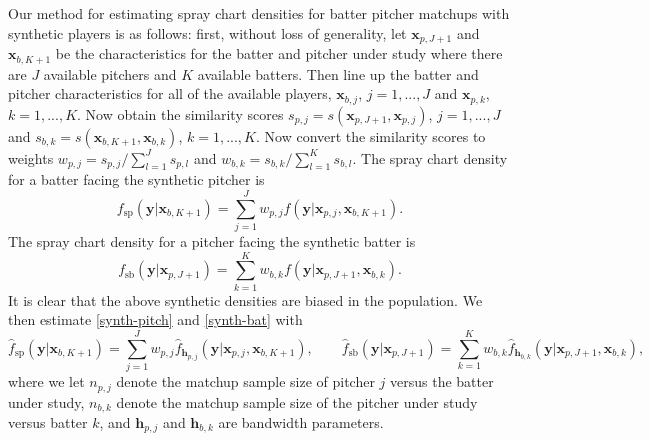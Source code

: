 \documentclass[11pt]{article}
\newcommand{\R}{\mathbb{R}}
\newcommand{\Xbf}{\textbf{X}}
\newcommand{\V}{\textbf{V}}
\newcommand{\W}{\textbf{W}}
\newcommand{\y}{\textbf{y}}
\newcommand{\x}{\textbf{x}}
\newcommand{\h}{\textbf{h}}
\newcommand{\Wstar}{\W^{\textstyle{*}}}
\begin{document}
Our method for estimating spray chart densities for batter pitcher matchups with synthetic players is as follows: first, without loss of generality, let $\x_{p,J+1}$ and $\x_{b,K+1}$ be the characteristics for the batter and pitcher under study where there are $J$ available pitchers and $K$ available batters. Then line up the batter and pitcher characteristics for all of the available players, $\x_{b,j}$, $j = 1,...,J$ and $\x_{p,k}$, $k = 1,...,K$. Now obtain the similarity scores $s_{p,j} = s(\x_{p,J+1},\x_{p,j})$, $j = 1,...,J$ and $s_{b,k} = s(\x_{b,K+1},\x_{b,k})$, $k = 1,...,K$. Now convert the similarity scores to weights $w_{p,j} = s_{p,j} / \sum_{l=1}^{J}s_{p,l}$ and $w_{b,k} = s_{b,k} / \sum_{l=1}^{K}s_{b,l}$. The spray chart density for a batter facing the synthetic pitcher is 
\begin{equation} \label{synth-pitch}
  f_{\text{sp}}(\y|\x_{b,K+1}) = \sum_{j=1}^J w_{p,j}f(\y|\x_{p,j},\x_{b,K+1}).
\end{equation}
The spray chart density for a pitcher facing the synthetic batter is 
\begin{equation} \label{synth-bat}
  f_{\text{sb}}(\y|\x_{p,J+1}) = \sum_{k=1}^K w_{b,k}f(\y|\x_{p,J+1},\x_{b,k}).
\end{equation}
It is clear that the above synthetic densities are biased in the population. We then estimate \eqref{synth-pitch} and \eqref{synth-bat} with
\begin{equation} \label{synth-est}
  \hat f_{\text{sp}}(\y|\x_{b,K+1}) = \sum_{j=1}^J w_{p,j}\hat f_{\h_{p,j}}(\y|\x_{p,j},\x_{b,K+1}), 
  \qquad
  \hat f_{\text{sb}}(\y|\x_{p,J+1}) = \sum_{k=1}^K w_{b,k}\hat f_{\h_{b,k}}(\y|\x_{p,J+1},\x_{b,k}),
\end{equation}
where we let $n_{p,j}$ denote the matchup sample size of pitcher $j$ versus the batter under study, $n_{b,k}$ denote the matchup sample size of the pitcher under study versus batter $k$, and $\h_{p,j}$ and $\h_{b,k}$ are bandwidth parameters.

\end{document}
